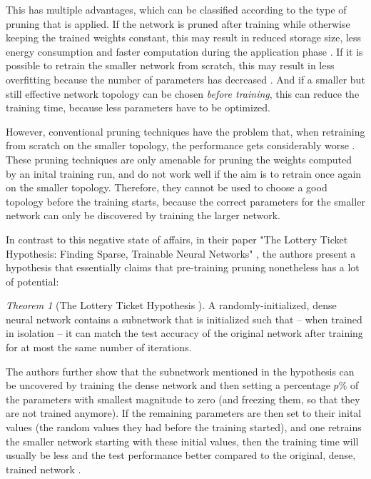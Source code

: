 \documentclass[12pt,final,twoside]{article}
\theoremstyle{plain}
\theoremstyle{definition}
\theoremstyle{remark}
\theoremstyle{named}
\newtheorem*{namedtheorem}{Theorem}
\begin{document}
This has multiple advantages, which can be classified according to the type of pruning that is applied. If the network is pruned after training while otherwise keeping the trained weights constant, this may result in reduced storage size, less energy consumption and faster computation during the application phase \cite{lottery}. If it is possible to retrain the smaller network from scratch, this may result in less overfitting because the number of parameters has decreased  \cite{learning-weights-connections}. And if a smaller but still effective network topology can be chosen \textit{before training}, this can reduce the training time, because less parameters have to be optimized.

However, conventional pruning techniques have the problem that, when retraining from scratch on the smaller topology, the performance gets considerably worse \cite{lottery}. These pruning techniques are only amenable for pruning the weights computed by an inital training run, and do not work well if the aim is to retrain once again on the smaller topology. Therefore, they cannot be used to choose a good topology before the training starts, because the correct parameters for the smaller network can only be discovered by training the larger network.

In contrast to this negative state of affairs, in their paper "The Lottery Ticket Hypothesis: Finding Sparse, Trainable Neural Networks" \cite{lottery}, the authors present a hypothesis that essentially claims that pre-training pruning nonetheless has a lot of potential:

\begin{namedtheorem}[The Lottery Ticket Hypothesis \cite{lottery}]
A randomly-initialized, dense neural network contains a subnetwork that is initialized such that -- when trained in isolation -- it can match the test accuracy of the original network after training for at most the same number of iterations.
\end{namedtheorem}

The authors further show that the subnetwork mentioned in the hypothesis can be uncovered by training the dense network and then setting a percentage $p\%$ of the parameters with smallest magnitude to zero (and freezing them, so that they are not trained anymore). If the remaining parameters are then set to their inital values (the random values they had before the training started), and one retrains the smaller network starting with these initial values, then the training time will usually be less and the test performance better compared to the original, dense, trained network \cite{lottery}.
\end{document}
